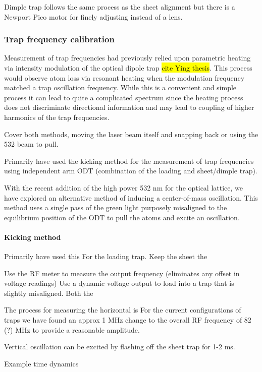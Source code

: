 Dimple trap follows the same process as the sheet alignment but there is a Newport Pico motor for finely adjusting instead of a lens.


\subsubsection{Trap frequency calibration} \label{sssec:1064_trap_freq}

Measurement of trap frequencies had previously relied upon parametric heating via intensity modulation of the optical dipole trap \hl{cite Ying thesis}. This process would observe atom loss via resonant heating when the modulation frequency matched a trap oscillation frequency. While this is a convenient and simple process it can lead to quite a complicated spectrum since the heating process does not discriminate directional information and may lead to coupling of higher harmonics of the trap frequencies. 

Cover both methods, moving the laser beam itself and snapping back or using the 532 beam to pull.

Primarily have used the kicking method for the measurement of trap frequencies using independent arm ODT (combination of the loading and sheet/dimple trap). 

With the recent addition of the high power 532 nm for the optical lattice, we have explored an alternative method of inducing a center-of-mass oscillation. This method uses a single pass of the green light purposely misaligned to the equilibrium position of the ODT to pull the atoms and excite an oscillation.

\paragraph{Kicking method}
Primarily have used this For the loading trap. Keep the sheet the 

Use the RF meter to measure the output frequency (eliminates any offset in voltage readings)
Use a dynamic voltage output to load into a trap that is slightly misaligned. Both the 

The process for measuring the horizontal is 
For the current configurations of traps we have found an approx 1 MHz change to the overall RF frequency of 82 (?) MHz to provide a reasonable amplitude. 

Vertical oscillation can be excited by flashing off the sheet trap for 1-2 ms. 

Example time dynamics

